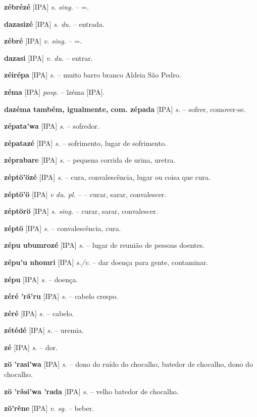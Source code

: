 {{{{\textbf{zébrézé} [IPA] \textit{s. sing.} -- =.

\textbf{dazasizé} [IPA] \textit{s. du.} -- entrada.

\textbf{zébré} [IPA] \textit{v. sing.} -- =.

\textbf{dazasi} [IPA] \textit{v. du.} -- entrar.

\textbf{zéirépa} [IPA] \textit{s.} -- muito barro branco  Aldeia São Pedro.

\textbf{zéma} [IPA] \textit{posp.} -- ĩzéma [IPA].

\textbf{dazéma também, igualmente, com. zépada} [IPA] \textit{s.} -- sofrer, comover-se.

\textbf{zépata'wa} [IPA] \textit{s.} -- sofredor.

\textbf{zépatazé} [IPA] \textit{s.} -- sofrimento, lugar de sofrimento.

\textbf{zéprabare} [IPA] \textit{s.} -- pequena corrida de urina, uretra.

\textbf{zéptö'özé} [IPA] \textit{s.} -- cura, convalescência, lugar ou coisa que cura.

\textbf{zéptö'ö} [IPA] \textit{v du. pl.} -- -- curar, sarar, convalescer.

\textbf{zéptörö} [IPA] \textit{s. sing.} -- curar, sarar, convalescer.

\textbf{zéptö} [IPA] \textit{s.} -- convalescência, cura.

\textbf{zépu ubumrozé} [IPA] \textit{s.} -- lugar de reunião de pessoas doentes.

\textbf{zépu'u nhomri} [IPA] \textit{s./v.} -- dar doença para gente, contaminar.

\textbf{zépu} [IPA] \textit{s.} -- doença.

\textbf{zéré 'rã'ru} [IPA] \textit{s.} -- cabelo crespo.

\textbf{zéré} [IPA] \textit{s.} -- cabelo.

\textbf{zétédé} [IPA] \textit{s.} -- uremia.

\textbf{zé} [IPA] \textit{s.} -- dor.

\textbf{zö 'rasi'wa} [IPA] \textit{s.} -- dono do ruído do chocalho, batedor de chocalho, dono do chocalho.

\textbf{zö 'rãsi'wa 'rada} [IPA] \textit{s.} -- velho batedor de chocalho.

\textbf{zö'rẽne} [IPA] \textit{v. sg.} -- beber. \href{https://xavante.pythonanywhere.com/static/dicionario/play.html?file=beber.wav}{\faHeadphones}

}}}}
